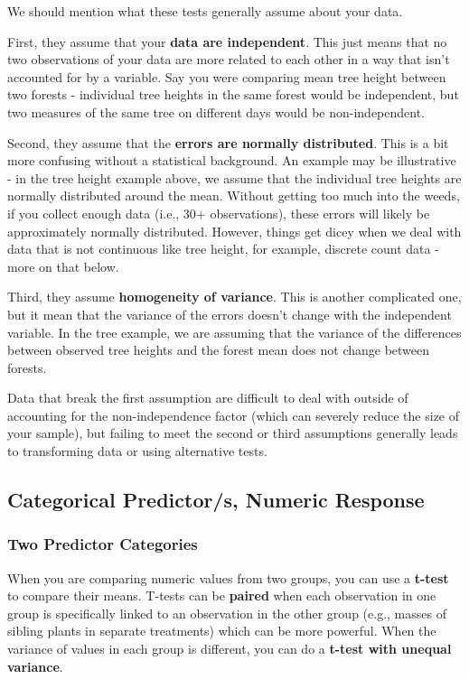 \documentclass[
  letterpaper,
  DIV=11,
  numbers=noendperiod]{scrreprt}
\begin{document}
We should mention what these tests generally assume about your data.

First, they assume that your \textbf{data are independent}. This just
means that no two observations of your data are more related to each
other in a way that isn't accounted for by a variable. Say you were
comparing mean tree height between two forests - individual tree heights
in the same forest would be independent, but two measures of the same
tree on different days would be non-independent.

Second, they assume that the \textbf{errors are normally distributed}.
This is a bit more confusing without a statistical background. An
example may be illustrative - in the tree height example above, we
assume that the individual tree heights are normally distributed around
the mean. Without getting too much into the weeds, if you collect enough
data (i.e., 30+ observations), these errors will likely be approximately
normally distributed. However, things get dicey when we deal with data
that is not continuous like tree height, for example, discrete count
data - more on that below.

Third, they assume \textbf{homogeneity of variance}. This is another
complicated one, but it mean that the variance of the errors doesn't
change with the independent variable. In the tree example, we are
assuming that the variance of the differences between observed tree
heights and the forest mean does not change between forests.

Data that break the first assumption are difficult to deal with outside
of accounting for the non-independence factor (which can severely reduce
the size of your sample), but failing to meet the second or third
assumptions generally leads to transforming data or using alternative
tests.

\subsection{Categorical Predictor/s, Numeric
Response}\label{categorical-predictors-numeric-response}

\subsubsection{Two Predictor Categories}\label{sec-ttest}

When you are comparing numeric values from two groups, you can use a
\textbf{t-test} to compare their means. T-tests can be \textbf{paired}
when each observation in one group is specifically linked to an
observation in the other group (e.g., masses of sibling plants in
separate treatments) which can be more powerful. When the variance of
values in each group is different, you can do a \textbf{t-test with
unequal variance}.
\end{document}
